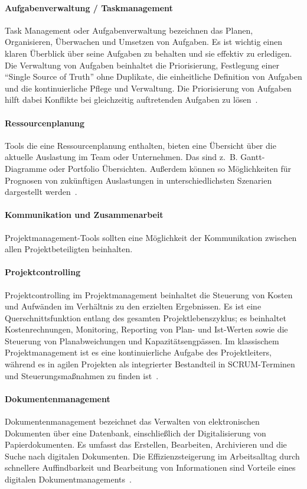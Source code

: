 \documentclass[sigconf, nonacm]{acmart}
\begin{document}
\paragraph{Aufgabenverwaltung / Taskmanagement}
Task Management oder Aufgabenverwaltung bezeichnen das Planen, Organisieren, Überwachen und Umsetzen von Aufgaben. Es ist wichtig einen klaren Überblick über seine Aufgaben zu behalten und sie effektiv zu erledigen. 
Die Verwaltung von Aufgaben beinhaltet die Priorisierung, Festlegung einer \enquote{Single Source of Truth} ohne Duplikate, die einheitliche Definition von Aufgaben und die kontinuierliche Pflege und Verwaltung. 
Die Priorisierung von Aufgaben hilft dabei Konflikte bei gleichzeitig auftretenden Aufgaben zu lösen~\cite{venzmer_task_2020}.

\paragraph{Ressourcenplanung}
Tools die eine Ressourcenplanung enthalten, bieten eine Übersicht über die aktuelle Auslastung im Team oder Unternehmen. Das sind z.~B. Gantt-Diagramme oder Portfolio Übersichten. Außerdem können so Möglichkeiten für Prognosen von zukünftigen Auslastungen in unterschiedlichsten Szenarien dargestellt werden~\cite{venzmer_wie_2020}.

\paragraph{Kommunikation und Zusammenarbeit}
Projektmanagement-Tools sollten eine Möglichkeit der Kommunikation zwischen allen Projektbeteiligten beinhalten.

\paragraph{Projektcontrolling}
Projektcontrolling im Projektmanagement beinhaltet die Steuerung von Kosten und Aufwänden im Verhältnis zu den erzielten Ergebnissen. Es ist eine Querschnittsfunktion entlang des gesamten Projektlebenszyklus; es beinhaltet Kostenrechnungen, Monitoring, Reporting von Plan- und Ist-Werten sowie die Steuerung von Planabweichungen und Kapazitätsengpässen. Im klassischem Projektmanagement ist es eine kontinuierliche Aufgabe des Projektleiters, während es in agilen Projekten als integrierter Bestandteil in SCRUM-Terminen und Steuerungsmaßnahmen zu finden ist~\cite{venzmer_projektcontrolling-tool_2020}.

\paragraph{Dokumentenmanagement}
Dokumentenmanagement bezeichnet das Verwalten von elektronischen Dokumenten über eine Datenbank, einschließlich der Digitalisierung von Papierdokumenten. Es umfasst das Erstellen, Bearbeiten, Archivieren und die Suche nach digitalen Dokumenten. Die Effizienzsteigerung im Arbeitsalltag durch schnellere Auffindbarkeit und Bearbeitung von Informationen sind Vorteile eines digitalen Dokumentmanagements~\cite{schmuck_dokumentenmanagement_2019}.
\end{document}
